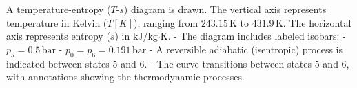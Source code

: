 A temperature-entropy (\( T \)-\( s \)) diagram is drawn. The vertical axis represents temperature in Kelvin (\( T [K] \)), ranging from \( 243.15 \, \text{K} \) to \( 431.9 \, \text{K} \). The horizontal axis represents entropy (\( s \)) in \( \text{kJ/kg·K} \).  
- The diagram includes labeled isobars:  
  - \( p_5 = 0.5 \, \text{bar} \)  
  - \( p_0 = p_6 = 0.191 \, \text{bar} \)  
- A reversible adiabatic (isentropic) process is indicated between states 5 and 6.  
- The curve transitions between states 5 and 6, with annotations showing the thermodynamic processes.